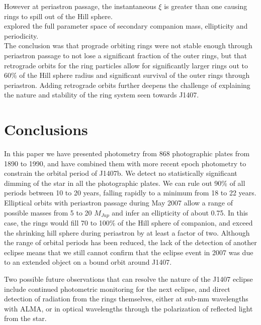 \documentclass[twocolumn]{aa}
\begin{document}
However at periastron passage, the instantaneous $\xi$ is greater than one causing rings to spill out of the Hill sphere.  \\
%
\citet{Rieder16} explored the full parameter space of secondary companion mass, ellipticity and periodicity. \\
%
The conclusion was that prograde orbiting rings were not stable enough through periastron passage to not lose a significant fraction of the outer rings, but that retrograde orbits for the ring particles allow for significantly larger rings out to 60\% of the Hill sphere radius and significant survival of the outer rings through periastron.
%
Adding retrograde orbits further deepens the challenge of explaining the nature and stability of the ring system seen towards J1407.

\section{Conclusions}\label{sec:conc}

In this paper we have presented photometry from 868 photographic plates from 1890 to 1990, and have combined them with more recent epoch photometry to constrain the orbital period of J1407b.
%
We detect no statistically significant dimming of the star in all the photographic plates.
%
We can rule out 90\% of all periods between 10 to 20 years, falling rapidly to a minimum from 18 to 22 years.
%
Elliptical orbits with periastron passage during May 2007 allow a range of possible masses from 5 to 20 $M_{Jup}$ and infer an ellipticity of about 0.75.
%
In this case, the rings would fill 70 to 100\% of the Hill sphere of companion, and exceed the shrinking hill sphere during periastron by at least a factor of two.
%
Although the range of orbital periods has been reduced, the lack of the detection of another eclipse means that we still cannot confirm that the eclipse event in 2007 was due to an extended object on a bound orbit around J1407.

Two possible future observations that can resolve the nature of the J1407 eclipse include continued photometric monitoring for the next eclipse, and direct detection of radiation from the rings themselves, either at sub-mm wavelengths with ALMA, or in optical wavelengths through the polarization of reflected light from the star.
\end{document}
